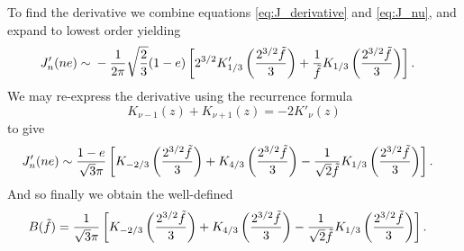 To find the derivative we combine equations \eqref{eq:J_derivative} and \eqref{eq:J_nu}, and expand to lowest order yielding
\begin{align}
J'_n(ne) \sim {} & -\frac{1}{2\pi}\sqrt{\frac{2}{3}}(1-e)\left[2^{3/2}K'_{1/3}\left(\frac{2^{3/2}\tilde{f}}{3}\right) + \frac{1}{\tilde{f}}K_{1/3}\left(\frac{2^{3/2}\tilde{f}}{3}\right)\right].
\end{align}
We may re-express the derivative using the recurrence formula \citep[section 3.71]{Watson1995}
\begin{equation}
K_{\nu-1}(z) + K_{\nu+1}(z) = -2K'_\nu(z)
\end{equation}
to give
\begin{align}
J'_n(ne)  \sim {} & \frac{1-e}{\sqrt{3}\pi}\left[K_{-2/3}\left(\frac{2^{3/2}\tilde{f}}{3}\right) + K_{4/3}\left(\frac{2^{3/2}\tilde{f}}{3}\right) - \frac{1}{\sqrt{2}\tilde{f}}K_{1/3}\left(\frac{2^{3/2}\tilde{f}}{3}\right)\right].
\end{align}
And so finally we obtain the well-defined
\begin{align}
B(\tilde{f})  = {} & \frac{1}{\sqrt{3}\pi}\left[K_{-2/3}\left(\frac{2^{3/2}\tilde{f}}{3}\right) + K_{4/3}\left(\frac{2^{3/2}\tilde{f}}{3}\right) - \frac{1}{\sqrt{2}\tilde{f}}K_{1/3}\left(\frac{2^{3/2}\tilde{f}}{3}\right)\right].
\end{align}

